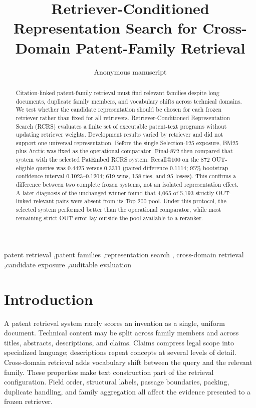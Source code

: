 \documentclass[final,5p,times,twocolumn]{elsarticle}
\newcommand{\RCRS}{RCRS}
\begin{document}
\begin{frontmatter}

\title{Retriever-Conditioned Representation Search for Cross-Domain Patent-Family Retrieval}

\author{Anonymous manuscript}

\begin{abstract}
Citation-linked patent-family retrieval must find relevant families despite
long documents, duplicate family members, and vocabulary shifts across
technical domains. We test whether the candidate representation should be
chosen for each frozen retriever rather than fixed for all retrievers.
Retriever-Conditioned Representation Search (\RCRS{}) evaluates a finite set
of executable patent-text programs without updating retriever weights.
Development results varied by retriever and did not support one universal
representation. Before the single Selection-125 exposure, BM25 plus Arctic
was fixed as the operational comparator. Final-872 then compared that system
with the selected PatEmbed RCRS system. Recall@100 on the 872 OUT-eligible
queries was 0.4425 versus 0.3311 (paired difference 0.1114; 95\% bootstrap
confidence interval 0.1023--0.1204; 619 wins, 158 ties, and 95 losses). This
confirms a difference between two complete frozen systems, not an isolated
representation effect. A later diagnosis of the unchanged winner found that
4,065 of 5,193 strictly OUT-linked relevant pairs were absent from its Top-200
pool. Under this protocol, the selected system performed better than the
operational comparator, while most remaining strict-OUT error lay outside the
pool available to a reranker.
\end{abstract}

\begin{keyword}
patent retrieval \sep patent families \sep representation search \sep
cross-domain retrieval \sep candidate exposure \sep auditable evaluation
\end{keyword}

\end{frontmatter}

\section{Introduction}

A patent retrieval system rarely scores an invention as a single, uniform
document. Technical content may be split across family members and across
titles, abstracts, descriptions, and claims. Claims compress legal scope into
specialized language; descriptions repeat concepts at several levels of
detail. Cross-domain retrieval adds vocabulary shift between the query and the
relevant family. These properties make text construction part of the retrieval
configuration. Field order, structural labels, passage boundaries, packing,
duplicate handling, and family aggregation all affect the evidence presented
to a frozen retriever.
\end{document}
